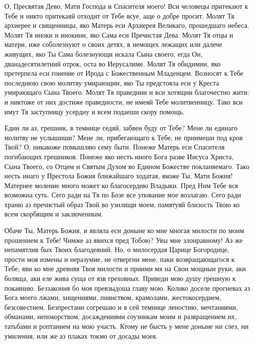 \begin{mymulticols}
 

О, Пресвятая Дево, Мати Господа и Спасителя моего! Вси человецы притекают к Тебе и никто притекаяй отходит от Тебе всуе, аще о добре просит. Молят Тя архиерее и священницы, яко Матерь еси Архиерея Великаго, прошедшаго небеса. Молят Тя иноки и инокини, яко Сама еси Пречистая Дева. Молят Тя отцы и матери, иже соболезнуют о своих детях, в немощех лежащих или далече живущих, яко Ты Сама болезнующи искала Сына своего, егда Он, дванадесятилетний отрок, оста во Иерусалиме. Молят Тя обидимии, яко претерпела еси гонение от Ирода с Божественным Младенцем. Возносят к Тебе последнюю свою молитву умирающии, яко Ты предстояла еси у Креста умирающаго Сына Твоего. Молят Тя праведнии и вси хотящии благочестно жити: и никтоже от них достиже праведности, не имеяй Тебе молитвенницу. Тако вси имут Тя заступницу усердну и всем подаеши скору помощь.

 Един ли аз, грешник, в темнице седяй, забвен буду от Тебе? Мене ли единаго молитву не услышиши? Мене ли, прибегающаго к Тебе, не приимеши под кров Твой? О, никакоже помышляю сему быти. Понеже Матерь еси Спасителя погибающих грешников. Понеже яко несть иного Бога разве Иисуса Христа, Сына Твоего, со Отцем и Святым Духом во Едином Божестве покланяемаго. Тако несть инаго у Престола Божия ближайшаго ходатая, якоже Ты, Мати Божия! Матернее моление много может ко благосердию Владыки. Пред Ним Тебе вся возможна суть. Сего ради на Тя по Бозе все упование мое возлагаю. Сего ради храню аз пречистый образ Твой во узилищи моем, памятуяй близость Твою ко всем скорбящим и заключенным. 

Обаче Ты, Матерь Божия, и являла еси доныне ко мне многая милости по моим прошением к Тебе! Чимже аз явихся пред Тобою? Увы мне злонравному! Аз же непамятлив бых Твоих благодеяний. Но, о милосердая Царице Богородице, прости моя измены и неразумие, не отвергни мене, паки возвращающагося к Тебе, яви ко мне древняя Твоя милости и приими мя на Свои мощныи руки, аки боляща, аки еле жива суща от язв греховных. Приведи мою душу грешную к покаянию. Беззакония бо моя превзыдоша главу мою. Колико доселе прогневах аз Бога моего лжами, хищениями, пиянством, крамолами, жестокосердием, безсовестием. Безпрестани согрешаю и в сей темнице леностию, мечтаниями, обманами, непокорством, досаждениями соузникам моим и развращением их, татьбами и роптанием на мою участь. Ктому не бысть у мене доныне ни слез, ни умиления, или же аз плаках токмо от досады моея. 


\end{mymulticols}
